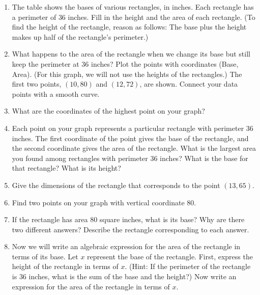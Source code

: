 \documentclass[10pt,]{book}
\theoremstyle{plain}
\theoremstyle{definition}
\theoremstyle{definition}
\theoremstyle{definition}
\theoremstyle{definition}
\theoremstyle{definition}
\numberwithin{equation}{section}
\begin{document}
\leavevmode%
\begin{enumerate}
\item\hypertarget{li-225}{}The table shows the bases of various rectangles, in inches. Each rectangle has a perimeter of \(36\) inches. Fill in the height and the area of each rectangle. (To find the height of the rectangle, reason as follows: The base plus the height makes up half of the rectangle’s perimeter.)
\item\hypertarget{li-226}{}What happens to the area of the rectangle when we change its base but still keep the perimeter at \(36\) inches? Plot the points with coordinates (Base, Area). (For this graph, we will not use the heights of the rectangles.) The first two points, \((10, 80)\) and \((12, 72)\), are shown. Connect your data points with a smooth curve.
\item\hypertarget{li-227}{}What are the coordinates of the highest point on your graph?%
\item\hypertarget{li-228}{}Each point on your graph represents a particular rectangle with perimeter \(36\) inches. The first coordinate of the point gives the base of the rectangle, and the second coordinate gives the area of the rectangle. What is the largest area you found among rectangles with perimeter \(36\) inches? What is the base for that rectangle? What is its height?
\item\hypertarget{li-229}{}Give the dimensions of the rectangle that corresponds to the point \((13, 65)\).
\item\hypertarget{li-230}{}Find two points on your graph with vertical coordinate \(80\).
\item\hypertarget{li-231}{}If the rectangle has area \(80\) square inches, what is its base? Why are there two different answers? Describe the rectangle corresponding to each answer.
\item\hypertarget{li-232}{}Now we will write an algebraic expression for the area of the rectangle in terms of its base. Let \(x\) represent the base of the rectangle. First, express the height of the rectangle in terms of \(x\). (Hint: If the perimeter of the rectangle is \(36\) inches, what is the sum of the base and the height?) Now write an expression for the area of the rectangle in terms of \(x\).

\end{enumerate}
\end{document}
